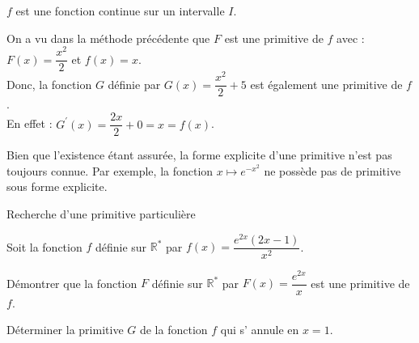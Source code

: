 \begin{bprop}
	\pointilles[\textwidth-0.5cm]
	
	\pointilles[\textwidth-0.5cm]
\end{bprop}

\begin{bdemo}
\end{bdemo}

\begin{bprop}
	$f$ est une fonction continue sur un intervalle $I$.\\
	\pointilles[\textwidth-0.5cm]
	
	\pointilles[\textwidth-0.5cm]
\end{bprop}


\begin{bdemo}
\end{bdemo}

\begin{bexemple}
	On a vu dans la méthode précédente que $F$ est une primitive de $f$ avec :\\
	$F(x)=\dfrac{x^{2}}{2}$ et $f(x)=x$.\\
	Donc, la fonction $G$ définie par $G(x)=\dfrac{x^{2}}{2}+5$ est également une primitive de $f$.\\
	En effet : $G^{\prime}(x)=\dfrac{2 x}{2}+0=x=f(x)$.
\end{bexemple}

\begin{bprop}
	\pointilles[\textwidth-0.5cm]
	
	\pointilles[\textwidth-0.5cm]
\end{bprop}

\begin{brmq}
	Bien que l'existence étant assurée, la forme explicite d'une primitive n'est pas toujours connue. Par exemple, la fonction $x \mapsto e^{-x^{2}}$ ne possède pas de primitive sous forme explicite.
\end{brmq}

\begin{bmethodet}{Recherche d'une primitive particulière}
	
	Soit la fonction $f$ définie sur $\mathbb{R}^{*}$ par $f(x)=\dfrac{e^{2 x}(2 x-1)}{x^{2}}$.
	\begin{enumMet}
		\item Démontrer que la fonction $F$ définie sur $\mathbb{R}^{*}$ par $F(x)=\dfrac{e^{2 x}}{x}$ est une primitive de $f$.\\
		\item Déterminer la primitive $G$ de la fonction $f$ qui s' annule en $x=1$.
	\end{enumMet}
	
\end{bmethodet}


